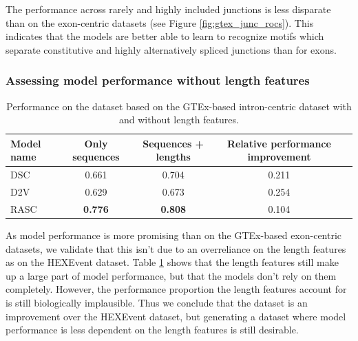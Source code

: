 

The performance across rarely and highly included junctions is less disparate than on the exon-centric datasets (see Figure \ref{fig:gtex_junc_rocs}). This indicates that the models are better able to learn to recognize motifs which separate constitutive and highly alternatively spliced junctions than for exons.

\subsubsection{Assessing model performance without length features}

\begin{table}[h!]
	\centering
	\begin{tabular}{| l | c | c | c| c} 
		\hline
		Model name & Only sequences & Sequences + lengths & Relative performance improvement\\
		\hline
		DSC & 0.661 & 0.704 & 0.211\\
		D2V & 0.629 & 0.673 & 0.254\\
		RASC & \textbf{0.776} & \textbf{0.808} & 0.104\\
		\hline
	\end{tabular}
	\caption{Performance on the dataset based on the GTEx-based intron-centric dataset with and without length features. 
	}
	\label{table:gtex_junc_nolens}
\end{table}

As model performance is more promising than on the GTEx-based exon-centric datasets, we validate that this isn't due to an overreliance on the length features as on the HEXEvent dataset. Table \ref{table:gtex_junc_nolens} shows that the length features still make up a large part of model performance, but that the models don't rely on them completely. However, the performance proportion the length features account for is still biologically implausible. %
Thus we conclude that the dataset is an improvement over the HEXEvent dataset, but generating a dataset where model performance is less dependent on the length features is still desirable. 



